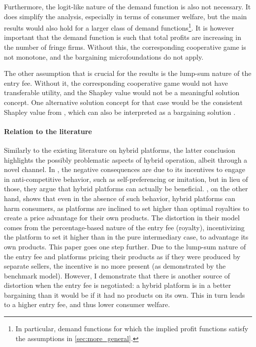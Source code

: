\documentclass[a4paper]{article}
\begin{document}
Furthermore, the logit-like nature of the demand function is also not necessary.
It does simplify the analysis, especially in terms of consumer welfare, but the main results would also hold for a larger class of demand functions\footnote{
    In particular, demand functions for which the implied profit functions satisfy the assumptions in \cref{sec:more_general}.
}.
It is however important that the demand function is such that total profits are increasing in the number of fringe firms.
Without this, the corresponding cooperative game is not monotone, and the bargaining microfoundations do not apply.

The other assumption that is crucial for the results is the lump-sum nature of the entry fee.
Without it, the corresponding cooperative game would not have transferable utility, and the Shapley value would not be a meaningful solution concept.
One alternative solution concept for that case would be the consistent Shapley value from \textcite{maschler1992consistent}, which can also be interpreted as a bargaining solution \parencite{hart1996bargaining}.

\paragraph{Relation to the literature}
Similarly to the existing literature on hybrid platforms, the latter conclusion highlights the possibly problematic aspects of hybrid operation, albeit through a novel channel.
In \textcite{hagiu2022should}, the negative consequences are due to its incentives to engage in anti-competitive behavior, such as self-preferencing or imitation, but in lieu of those, they argue that hybrid platforms can actually be beneficial.
\textcite{anderson2021hybrid}, on the other hand, shows that even in the absence of such behavior, hybrid platforms can harm consumers, as platforms are inclined to set higher than optimal royalties to create a price advantage for their own products.
The distortion in their model comes from the percentage-based nature of the entry fee (royalty), incentivizing the platform to set it higher than in the pure intermediary case, to advantage its own products.
This paper goes one step further.
Due to the lump-sum nature of the entry fee and platforms pricing their products as if they were produced by separate sellers, the incentive is no more present (as demonstrated by the benchmark model).
However, I demonstrate that there is another source of distortion when the entry fee is negotiated: a hybrid platform is in a better bargaining than it would be if it had no products on its own.
This in turn leads to a higher entry fee, and thus lower consumer welfare.
\end{document}
